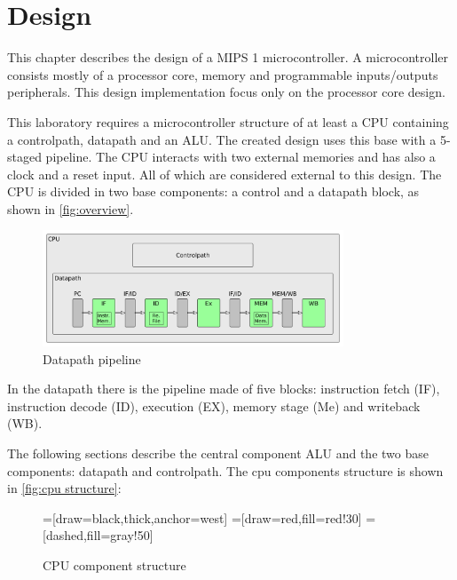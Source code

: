 \chapter{Design}
This chapter describes the design of a MIPS 1 microcontroller. A microcontroller consists mostly of a processor core, memory and programmable inputs/outputs peripherals. 
This design implementation focus only on the processor core design.

This laboratory requires a microcontroller structure of at least a CPU containing a controlpath, datapath and an ALU. The created design uses this base with a 5-staged pipeline.
The CPU interacts with two external memories and has also a clock and a reset input. All of which are considered external to this design.
The CPU is divided in two base components: a control and a datapath block, as shown  in \autoref{fig:overview}.



\begin{figure}[h!]
  \centering
  \includegraphics[width=0.8\textwidth]{figure/overview.png}
  \caption{Datapath pipeline}
  \label{fig:overview}
\end{figure}


In the datapath there is the pipeline made of five blocks: instruction fetch (IF), instruction decode (ID), execution (EX), memory stage (Me) and writeback (WB).

The following sections describe the central component ALU and the two base components: datapath and controlpath.
The cpu components structure is shown in \autoref{fig:cpu structure}:
\begin{figure}[h!]
\begin{center}
 =[draw=black,thick,anchor=west]
=[draw=red,fill=red!30]
=[dashed,fill=gray!50]
\caption{CPU component structure}
\label{fig:cpu structure}
\end{center}
\end{figure}

	
	
	
	